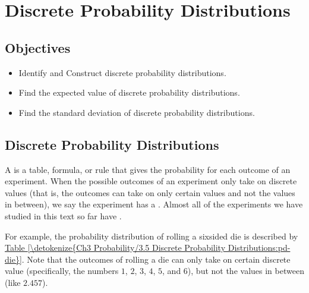 \documentclass[letterpaper,10pt,english]{jupyterBook}
\begin{document}
\sphinxstepscope


\section{Discrete Probability Distributions}
\label{\detokenize{Ch3 Probability/3.5 Discrete Probability Distributions:discrete-probability-distributions}}\label{\detokenize{Ch3 Probability/3.5 Discrete Probability Distributions::doc}}

\subsection{Objectives}
\label{\detokenize{Ch3 Probability/3.5 Discrete Probability Distributions:objectives}}\begin{itemize}
\item {} 
\sphinxAtStartPar
Identify and Construct discrete probability distributions.

\item {} 
\sphinxAtStartPar
Find the expected value of discrete probability distributions.

\item {} 
\sphinxAtStartPar
Find the standard deviation of discrete probability distributions.

\end{itemize}


\subsection{Discrete Probability Distributions}
\label{\detokenize{Ch3 Probability/3.5 Discrete Probability Distributions:id1}}
\sphinxAtStartPar
A  is a table, formula, or rule that gives the probability for each outcome of an experiment. When the possible outcomes of an experiment only take on discrete values (that is, the outcomes can take on only certain values and not the values in between), we say the experiment has a . Almost all of the experiments we have studied in this text so far have .

\sphinxAtStartPar
For example, the probability distribution of rolling a six\sphinxhyphen{}sided die is described by \hyperref[\detokenize{Ch3 Probability/3.5 Discrete Probability Distributions:pd-die}]{Table \ref{\detokenize{Ch3 Probability/3.5 Discrete Probability Distributions:pd-die}}}. Note that the outcomes of rolling a die can only take on certain discrete value (specifically, the numbers \(1\), \(2\), \(3\), \(4\), \(5\), and \(6\)), but not the values in between (like \(2.457\)).
\end{document}
